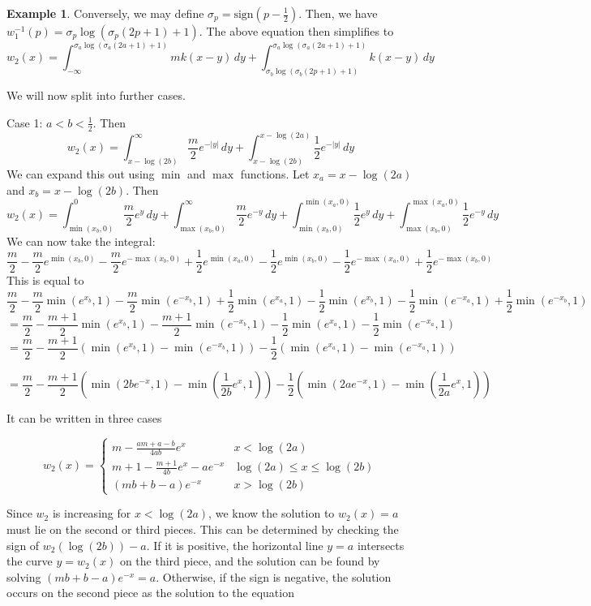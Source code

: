 \documentclass[11pt]{article}
\theoremstyle{definition}
\newtheorem{ex}[thm]{Example}
\numberwithin{equation}{section}
\numberwithin{thm}{section}
\begin{document}
\begin{ex}
Conversely, we may define $\sigma_p=\text{sign}(p-\frac{1}{2})$. Then, we have $w_1^{-1}(p)=\sigma_p\log(\sigma_p(2p+1)+1)$. The above equation then simplifies to
\begin{equation}
w_2(x) = \int_{-\infty}^{\sigma_a\log(\sigma_a(2a+1)+1)} mk(x-y)\,dy + \int_{\sigma_b\log(\sigma_b(2p+1)+1)}^{\sigma_a\log(\sigma_a(2a+1)+1)} k(x-y)\,dy
\end{equation}

We will now split into further cases.

Case 1: $a<b<\frac{1}{2}$. Then
$$ w_2(x) = \int_{x-\log(2b)}^{\infty} \frac{m}{2}e^{-|y|}\,dy + \int_{x-\log(2b)}^{x-\log(2a)} \frac{1}{2}e^{-|y|} \,dy $$
We can expand this out using $\min$ and $\max$ functions. Let $x_a=x-\log(2a)$ and $x_b=x-\log(2b)$. Then
$$ w_2(x) = \int_{\min(x_b,0)}^0 \frac{m}{2} e^y \, dy + \int_{\max(x_b,0)}^{\infty} \frac{m}{2} e^{-y} \, dy
+ \int_{\min(x_b,0)}^{\min(x_a,0)} \frac{1}{2} e^y \, dy + \int_{\max(x_b,0)}^{\max(x_a,0)} \frac{1}{2} e^{-y} \, dy $$
We can now take the integral:
$$ \frac{m}{2} - \frac{m}{2} e^{\min(x_b,0)} - \frac{m}{2} e^{-\max(x_b,0)} + \frac{1}{2} e^{\min(x_a,0)} - \frac{1}{2} e^{\min(x_b,0)} - \frac{1}{2} e^{-\max(x_a,0)} + \frac{1}{2} e^{-\max(x_b,0)} $$
This is equal to
$$ \frac{m}{2} - \frac{m}{2} \min(e^{x_b},1) - \frac{m}{2} \min(e^{-x_b},1) + \frac{1}{2} \min(e^{x_a},1) - \frac{1}{2} \min(e^{x_b},1) - \frac{1}{2} \min(e^{-x_a},1) + \frac{1}{2} \min(e^{-x_b},1) $$
$$ = \frac{m}{2} - \frac{m+1}{2} \min(e^{x_b},1) - \frac{m+1}{2} \min(e^{-x_b},1) - \frac{1}{2} \min(e^{x_a},1) - \frac{1}{2} \min(e^{-x_a},1)$$
$$ = \frac{m}{2} - \frac{m+1}{2}\left( \min(e^{x_b},1) - \min(e^{-x_b},1) \right) - \frac{1}{2} \left( \min(e^{x_a},1) - \min(e^{-x_a},1) \right) $$

$$ = \frac{m}{2} - \frac{m+1}{2}\left( \min(2be^{-x},1) - \min(\frac{1}{2b}e^{x},1) \right) - \frac{1}{2} \left( \min(2ae^{-x},1) - \min(\frac{1}{2a}e^{x},1) \right) $$

It can be written in three cases

$$ w_2(x) = \begin{cases} \displaystyle
m - \frac{am+a-b}{4ab} e^x & x <\log(2a) \\
\displaystyle
m + 1 - \frac{m+1}{4b} e^x - ae^{-x} & \log(2a) \leq x \leq \log(2b) \\
\displaystyle
(mb+b-a) e^{-x}  & x > \log(2b)
\end{cases} $$

Since $w_2$ is increasing for $x<\log(2a)$, we know the solution to $w_2(x)=a$ must lie on the second or third pieces. This can be determined by checking the sign of $w_2(\log(2b))-a$. If it is positive, the horizontal line $y=a$ intersects the curve $y=w_2(x)$ on the third piece, and the solution can be found by solving $(mb+b-a)e^{-x}=a$. Otherwise, if the sign is negative, the solution occurs on the second piece as the solution to the equation


\end{ex}
\end{document}
